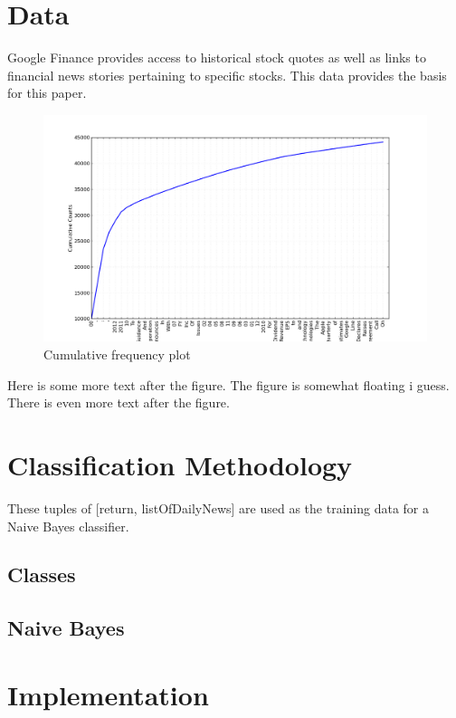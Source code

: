 \documentclass[twocolumn]{article}
\begin{document}
\section{Data}
Google Finance provides access to historical stock quotes as well as links to financial news stories pertaining to specific stocks. This data provides the basis for this paper.
\begin{figure}[htb]
\centering
\includegraphics[scale=0.25]{cum_graph.png}
\caption{Cumulative frequency plot}
\end{figure}
Here is some more text after the figure. The figure is somewhat floating i guess.  There is even more text after the figure.  

\section{Classification Methodology}
These tuples of [return, listOfDailyNews] are used as the training data for a Naive Bayes classifier. 
\subsection{Classes}

\subsection{Naive Bayes}


\section{Implementation}
\end{document}
